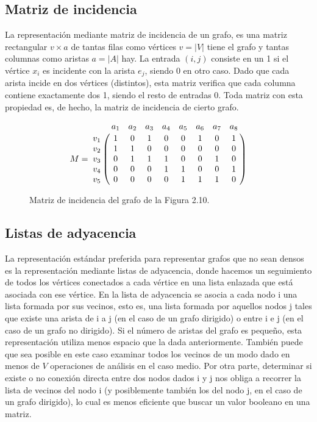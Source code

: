 \subsection{Matriz de incidencia}

La representación mediante matriz de incidencia de un grafo, es una matriz rectangular $v \times a$ de tantas filas como vértices $v = |V|$ tiene el grafo y tantas columnas como aristas $a = |A|$ hay. La entrada $(i,j)$ consiste en un 1 si el vértice $x_i$ es incidente con la arista $e_j$, siendo 0 en otro caso. Dado que cada arista incide en dos vértices (distintos), esta matriz verifica que cada columna contiene exactamente dos 1, siendo el resto de entradas 0. Toda matriz con esta propiedad es, de hecho, la matriz de incidencia de cierto grafo.

\begin{center}
\[
M = \bordermatrix{~ & a_1 & a_2 & a_3 & a_4 & a_5 & a_6 & a_7 & a_8 \cr
                  v_1 & 1 & 0 & 1 & 0 & 0 & 1 & 0 & 1 \cr
                  v_2 & 1 & 1 & 0 & 0 & 0 & 0 & 0 & 0 \cr
                  v_3 & 0 & 1 & 1 & 1 & 0 & 0 & 1 & 0 \cr
                  v_4 & 0 & 0 & 0 & 1 & 1 & 0 & 0 & 1 \cr
                  v_5 & 0 & 0 & 0 & 0 & 1 & 1 & 1 & 0 \cr}
\]
\end{center}
\begin{figure}[H]
\begin{center}
\caption{Matriz de incidencia del grafo de la Figura 2.10.}
\end{center}
\end{figure}


\subsection{Listas de adyacencia}

La representación estándar preferida para representar grafos que no sean densos es la representación mediante listas de adyacencia, donde hacemos un seguimiento de todos los vértices conectados a cada vértice en una lista enlazada que está asociada con ese vértice. En la lista de adyacencia se asocia a cada nodo i una lista formada por sus vecinos, esto es, una lista formada por aquellos nodos j tales que existe una arista de i a j (en el caso de un grafo dirigido) o entre i e j (en el caso de un grafo no dirigido). Si el número de aristas del grafo es pequeño, esta representación utiliza menos espacio que la dada anteriormente. También puede que sea posible en este caso examinar todos los vecinos de un modo dado en menos de $V$ operaciones de análisis en el caso medio. Por otra parte, determinar si existe o no conexión directa entre dos nodos dados i y j nos obliga a recorrer la lista de vecinos del nodo i (y posiblemente también los del nodo j, en el caso de un grafo dirigido), lo cual es menos eficiente que buscar un valor booleano en una matriz.\\

